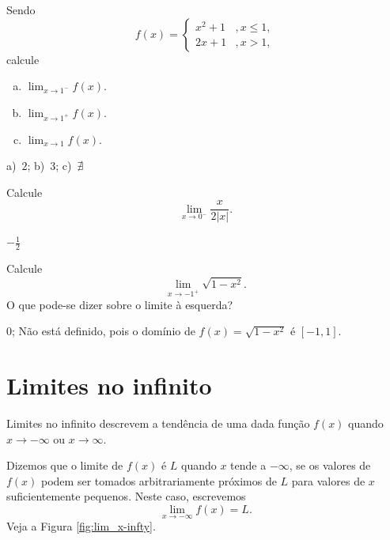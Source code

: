 \begin{exer}
  Sendo
  \begin{equation}
    f(x) = \left\{
      \begin{array}{ll}
        x^2+1 &, x\leq 1,\\
        2x+1 &, x>1,
      \end{array}
    \right.
  \end{equation}
  calcule
  \begin{enumerate}[a)]
  \item $\displaystyle \lim_{x\to 1^-} f(x)$.
  \item $\displaystyle \lim_{x\to 1^+} f(x)$.
  \item $\displaystyle \lim_{x\to 1} f(x)$.
  \end{enumerate}
\end{exer}
\begin{resp}
  a)~$2$; b)~$3$; c)~$\nexists$
\end{resp}

\begin{exer}
  Calcule
  \begin{equation}
    \lim_{x\to 0^-} \frac{x}{2|x|}.
  \end{equation}
\end{exer}
\begin{resp}
  $-\frac{1}{2}$
\end{resp}

\begin{exer}
  Calcule
  \begin{equation}
    \lim_{x\to -1^+} \sqrt{1-x^2}.
  \end{equation}
  O que pode-se dizer sobre o limite à esquerda?
\end{exer}
\begin{resp}
  $0$; Não está definido, pois o domínio de $f(x)=\sqrt{1-x^2}$ é $[-1, 1]$.
\end{resp}

\section{Limites no infinito}\label{cap_lim_sec_liminf}

Limites no infinito descrevem a tendência de uma dada função $f(x)$ quando $x\to -\infty$ ou $x\to\infty$.

Dizemos que o limite de $f(x)$ é $L$ quando $x$ tende a $-\infty$, se os valores de $f(x)$ podem ser tomados arbitrariamente próximos de $L$ para valores de $x$ suficientemente pequenos. Neste caso, escrevemos
\begin{equation}
  \lim_{x\to -\infty} f(x) = L.
\end{equation}
Veja a Figura \ref{fig:lim_x-infty}.

